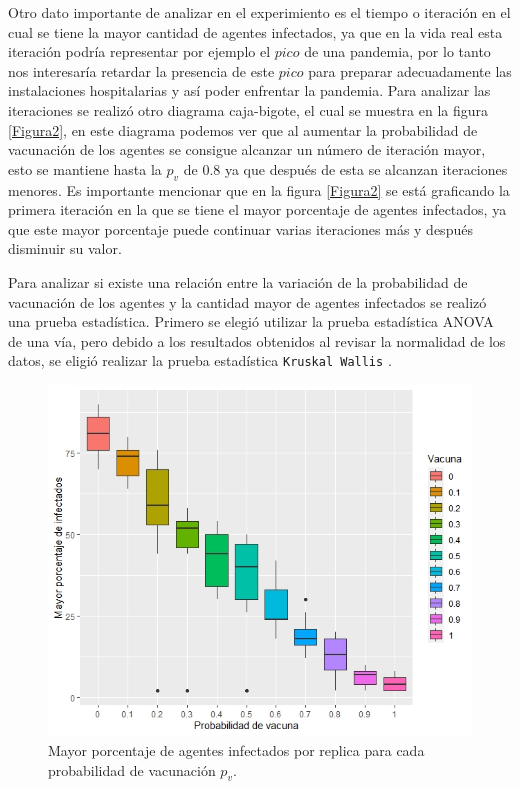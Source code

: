 \documentclass{article}
\begin{document}
Otro dato importante de analizar en el experimiento es el tiempo o iteración en el cual se tiene la mayor cantidad de agentes infectados, ya que en la vida real esta iteración podría representar por ejemplo el $pico$ de una pandemia, por lo tanto nos interesaría retardar la presencia de este $pico$ para preparar adecuadamente las instalaciones hospitalarias y así poder enfrentar la pandemia. Para analizar las iteraciones se realizó otro diagrama caja-bigote, el cual se muestra en la figura \ref{Figura2}, en este diagrama podemos ver que al aumentar la probabilidad de vacunación de los agentes se consigue alcanzar un número de iteración mayor, esto se mantiene hasta la $p_v$ de $0.8$ ya que después de esta se alcanzan iteraciones menores. Es importante mencionar que en la figura \ref{Figura2} se está graficando la primera iteración en la que se tiene el mayor porcentaje de agentes infectados, ya que este mayor porcentaje puede continuar varias iteraciones más y después disminuir su valor.
\bigskip

Para analizar si existe una relación entre la variación de la probabilidad de vacunación de los agentes y la cantidad mayor de agentes infectados se realizó una prueba estadística. Primero se elegió utilizar la prueba estadística ANOVA de una vía, pero debido a los resultados obtenidos al revisar la normalidad de los datos, se eligió realizar la prueba estadística \texttt{Kruskal Wallis} \citep{2}.
\bigskip

\newpage

\begin{figure} [h!]%
    \centering
    \includegraphics[width=129mm]{Figura1.jpeg} %
    \caption{Mayor porcentaje de agentes infectados por replica para cada probabilidad de vacunación $p_v$.}
    \label{Figura1}
\end{figure}
\end{document}
